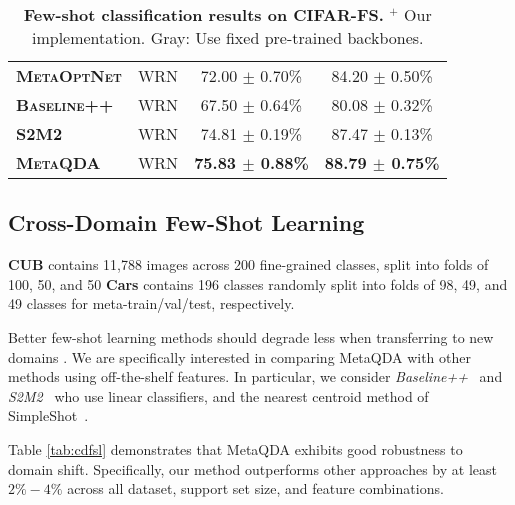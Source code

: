 \documentclass[10pt,twocolumn,letterpaper]{article}
\begin{document}
\begin{table}[t]
{\begin{tabular}{@{} llcc @{}}
\textbf{\textsc{MetaOptNet}} \cite{lee2019meta} & WRN & 72.00 $\pm$ 0.70\% & 84.20 $\pm$ 0.50\% \\
\rowcolor{Gray} \textbf{\textsc{Baseline++}} \cite{mangla2020charting,chen2019closerfewshot} & WRN & 67.50 $\pm$ 0.64\% & 80.08 $\pm$ 0.32\% \\
\rowcolor{Gray} \textbf{\textsc{S2M2}} \cite{mangla2020charting} & WRN & 74.81 $\pm$ 0.19\% & 87.47 $\pm$ 0.13\% \\
\rowcolor{Gray} \textbf{\textsc{MetaQDA}} & WRN & \textbf{75.83 $\pm$ 0.88\%} & \textbf{88.79 $\pm$ 0.75\%} \\ 

\bottomrule
\end{tabular}}
\vspace{-1em}
\caption{\small \small
\textbf{Few-shot classification results on CIFAR-FS.}
$^+$  Our implementation. Gray: Use fixed pre-trained backbones.}
\label{tab:fsl_cifarfs}
\end{table}


\subsection{Cross-Domain Few-Shot Learning}

\textbf{CUB} \cite{hilliard2018few} contains 11,788 images across 200 fine-grained classes, split into folds of 100, 50, and 50 \textbf{Cars} \cite{krause2013cars,tseng2020cross} contains 196 classes randomly split into folds of 98, 49, and 49 classes for meta-train/val/test, respectively.


Better few-shot learning methods should degrade less when transferring to new domains \cite{chen2019closerfewshot,tseng2020cross}. 
We are specifically interested in comparing MetaQDA with other methods using off-the-shelf features. In particular, we consider \textit{Baseline++}~\cite{chen2019closerfewshot} and
\textit{S2M2}~\cite{mangla2020charting} who use linear classifiers, and the nearest centroid method of SimpleShot~\cite{wang2019simpleshot}. 

Table \ref{tab:cdfsl} demonstrates that MetaQDA exhibits good robustness to domain shift. Specifically, our method outperforms other approaches by at least $2\%-4\%$ across all dataset, support set size, and feature combinations.
\end{document}
